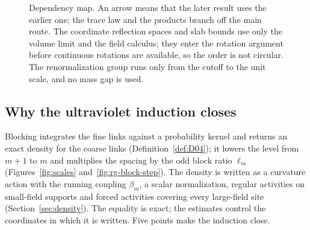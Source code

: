 \begin{figure}[ht]
\caption{Dependency map. An arrow means that the later result uses the earlier one; the trace law and the products branch off the main route. The coordinate reflection spaces and slab bounds use only the volume limit and the field calculus; they enter the rotation argument before continuous rotations are available, so the order is not circular. The renormalization group runs only from the cutoff to the unit scale, and no mass gap is used.}\label{fig:dependency}
\end{figure}

\subsection{Why the ultraviolet induction closes}\label{sec:closes}

Blocking integrates the fine links against a probability kernel and returns an exact density for the coarse links (Definition~\ref{def:D04}); it lowers the level from $m+1$ to $m$ and multiplies the spacing by the odd block ratio $\ell_m$ (Figures~\ref{fig:scales} and~\ref{fig:rg-block-step}). The density is written as a curvature action with the running coupling $\beta_m$, a scalar normalization, regular activities on small-field supports and forced activities covering every large-field site (Section~\ref{sec:density}). The equality is exact; the estimates control the coordinates in which it is written. Five points make the induction close.

